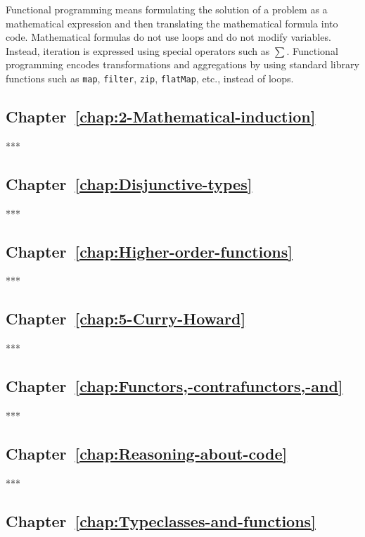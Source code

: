 Functional programming means formulating the solution of a problem
as a mathematical expression and then translating the mathematical
formula into code. Mathematical formulas do not use loops and do not
modify variables. Instead, iteration is expressed using special operators
such as $\sum$. Functional programming encodes transformations and
aggregations by using standard library functions such as \lstinline!map!,
\lstinline!filter!, \lstinline!zip!, \lstinline!flatMap!, etc.,
instead of loops.

\subsection{Chapter~\ref{chap:2-Mathematical-induction}}

{*}{*}{*}

\subsection{Chapter~\ref{chap:Disjunctive-types}}

{*}{*}{*}

\subsection{Chapter~\ref{chap:Higher-order-functions}}

{*}{*}{*}

\subsection{Chapter~\ref{chap:5-Curry-Howard}}

{*}{*}{*}

\subsection{Chapter~\ref{chap:Functors,-contrafunctors,-and}}

{*}{*}{*}

\subsection{Chapter~\ref{chap:Reasoning-about-code}}

{*}{*}{*}

\subsection{Chapter~\ref{chap:Typeclasses-and-functions}}

